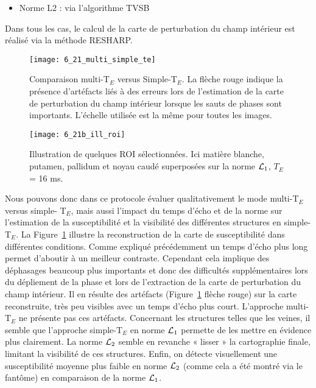 {\begin{itemize}
\begin{itemize}
\begin{itemize}
		\end{itemize}
	\item Norme L2 : via l’algorithme TVSB
	\end{itemize}
\end{itemize}
Dans tous les cas, le calcul de la carte de perturbation du champ intérieur est réalisé via la
méthode RESHARP.\\
\begin{figure}[!t]
\centering
\texttt{[image: 6\_21\_multi\_simple\_te]}
\caption{Comparaison multi-T$_E$ versus Simple-T$_E$. La flèche rouge indique la présence d’artéfacts liés à des erreurs
lors de l’estimation de la carte de perturbation du champ intérieur lorsque les sauts de phases sont importants.
L’échelle utilisée est la même pour toutes les images.}
\label{fig:6_21_multi_simple_te}	
\end{figure}
\begin{figure}[!b]
\centering
\texttt{[image: 6\_21b\_ill\_roi]}
\caption{Illustration de quelques ROI sélectionnées. Ici matière blanche, putamen, pallidum et noyau caudé
superposées sur la norme ${\cal L}_1$, $T_E$= 16 ms.}
\label{fig:6_21b_ill_roi}	
\end{figure}
Nous pouvons donc dans ce protocole évaluer qualitativement le mode multi-T$_E$ versus simple-
T$_E$, mais aussi l’impact du temps d’écho et de la norme sur l’estimation de la susceptibilité et la visibilité
des différentes structures en simple-T$_E$. La Figure~\ref{fig:6_21_multi_simple_te} illustre la reconstruction de la carte de
susceptibilité dans différentes conditions. Comme expliqué précédemment un temps d’écho plus long
permet d’aboutir à un meilleur contraste. Cependant cela implique des déphasages beaucoup plus
importants et donc des difficultés supplémentaires lors du dépliement de la phase et lors de
l’extraction de la carte de perturbation du champ intérieur. Il en résulte des artéfacts (Figure~\ref{fig:6_21_multi_simple_te} flèche
rouge) sur la carte reconstruite, très peu visibles avec un temps d’écho plus court. L’approche multi-
T$_E$ ne présente pas ces artéfacts. Concernant les structures telles que les veines, il semble que
l’approche simple-T$_E$ en norme ${\cal L}_1$ permette de les mettre en évidence plus clairement. La norme ${\cal L}_2$
semble en revanche « lisser » la cartographie finale, limitant la visibilité de ces structures. Enfin, on
détecte visuellement une susceptibilité moyenne plus faible en norme ${\cal L}_2$ (comme cela a été montré
via le fantôme) en comparaison de la norme ${\cal L}_1$.\\
}
